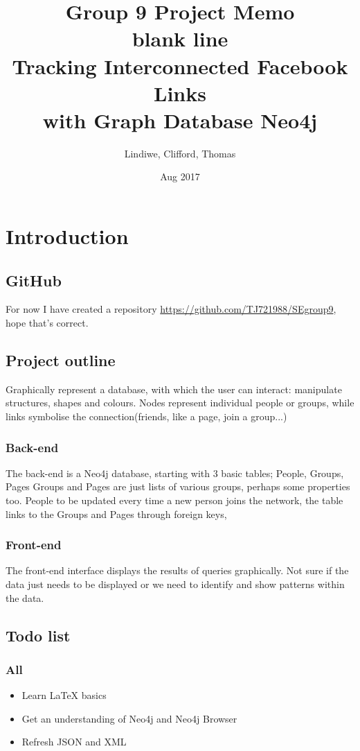 \documentclass[11pt]{article}
\title{%
Group 9 Project Memo\\\large
\color{white} blank line\\
\color{black}
Tracking Interconnected Facebook Links\\
with Graph Database Neo4j}
\date{Aug 2017}
\author{Lindiwe, Clifford, Thomas}
\begin{document}
\maketitle
{}
\newpage
\tableofcontents
\newpage
{}
\section{Introduction}
\subsection{GitHub}
For now I have created a repository \url{https://github.com/TJ721988/SEgroup9}, hope that's correct.

\subsection{Project outline}
Graphically represent a database, with which the user can interact: manipulate structures, shapes and colours. 
Nodes represent individual people or groups, while links symbolise the connection(friends, like a page, join a group...)
\subsubsection{Back-end}
The back-end is a Neo4j database, starting with 3 basic tables; People, Groups, Pages
Groups and Pages are just lists of various groups, perhaps some properties too.
People to be updated every time a new person joins the network, the table links to the Groups and Pages through foreign keys,

\subsubsection{Front-end}
The front-end interface displays the results of queries graphically. 
Not sure if the data just needs to be displayed or we need to identify and show patterns within the data. 

\subsection{Todo list}
\subsubsection{All}
\begin{itemize}
\item Learn LaTeX basics
\item Get an understanding of Neo4j and Neo4j Browser
\item Refresh JSON and XML
\end{itemize}
\end{document}
